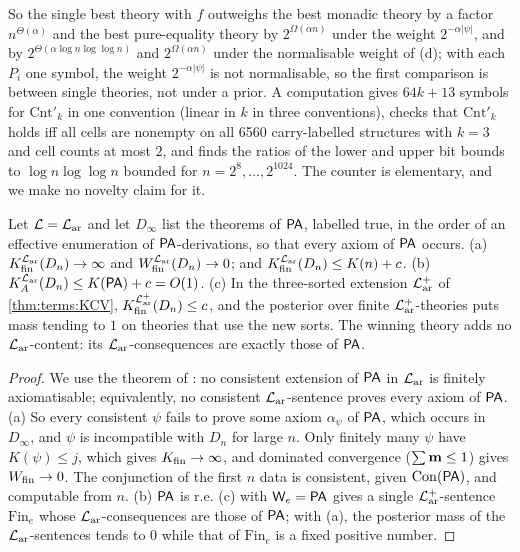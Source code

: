 So the single best theory with $f$ outweighs the best monadic theory by a factor $n^{\Theta(\alpha)}$ and the best pure-equality theory by $2^{\Omega(\alpha n)}$ under the weight $2^{-\alpha\lvert\psi\rvert}$, and by $2^{\Theta(\alpha\log n\log\log n)}$ and $2^{\Omega(\alpha n)}$ under the normalisable weight of (d); with each $P_i$ one symbol, the weight $2^{-\alpha\lvert\psi\rvert}$ is not normalisable, so the first comparison is between single theories, not under a prior. A computation gives $64k+13$ symbols for $\mathrm{Cnt}'_k$ in one convention (linear in $k$ in three conventions), checks that $\mathrm{Cnt}'_k$ holds iff all cells are nonempty on all 6560 carry-labelled structures with $k=3$ and cell counts at most $2$, and finds the ratios of the lower and upper bit bounds to $\log n\log\log n$ bounded for $n=2^8,\dots,2^{1024}$. The counter is elementary, and we make no novelty claim for it.

\begin{theorem}\label{thm:terms:PA}
Let $\mathcal L=\mathcal{L}_{\mathrm{ar}}$ and let $D_\infty$ list the theorems of $\mathsf{PA}$, labelled true, in the order of an effective enumeration of $\mathsf{PA}$-derivations, so that every axiom of $\mathsf{PA}$ occurs.
(a) $K_{\mathrm{fin}}^{\mathcal{L}_{\mathrm{ar}}}(D_n)\to\infty$ and $W_{\mathrm{fin}}^{\mathcal{L}_{\mathrm{ar}}}(D_n)\to0$; and $K_{\mathrm{fin}}^{\mathcal{L}_{\mathrm{ar}}}(D_n)\le K(n)+c$.
(b) $K_{A}^{\mathcal{L}_{\mathrm{ar}}}(D_n)\le K(\mathsf{PA})+c=O(1)$.
(c) In the three-sorted extension $\mathcal{L}_{\mathrm{ar}}^+$ of \cref{thm:terms:KCV}, $K_{\mathrm{fin}}^{\mathcal{L}_{\mathrm{ar}}^+}(D_n)\le c$, and the posterior over finite $\mathcal{L}_{\mathrm{ar}}^+$-theories puts mass tending to $1$ on theories that use the new sorts. The winning theory adds no $\mathcal{L}_{\mathrm{ar}}$-content: its $\mathcal{L}_{\mathrm{ar}}$-consequences are exactly those of $\mathsf{PA}$.
\end{theorem}

\begin{proof}
We use the theorem of \citet{rylnardzewski1952role}: no consistent extension of $\mathsf{PA}$ in $\mathcal{L}_{\mathrm{ar}}$ is finitely axiomatisable; equivalently, no consistent $\mathcal{L}_{\mathrm{ar}}$-sentence proves every axiom of $\mathsf{PA}$. (a) So every consistent $\psi$ fails to prove some axiom $\alpha_\psi$ of $\mathsf{PA}$, which occurs in $D_\infty$, and $\psi$ is incompatible with $D_n$ for large $n$. Only finitely many $\psi$ have $K(\psi)\le j$, which gives $K_{\mathrm{fin}}\to\infty$, and dominated convergence ($\sum\mathbf{m}\le1$) gives $W_{\mathrm{fin}}\to0$. The conjunction of the first $n$ data is consistent, given $\mathrm{Con}(\mathsf{PA})$, and computable from $n$. (b) $\mathsf{PA}$ is r.e. (c)  with $\mathsf{W}_{e}=\mathsf{PA}$ gives a single $\mathcal{L}_{\mathrm{ar}}^+$-sentence $\mathrm{Fin}_e$ whose $\mathcal{L}_{\mathrm{ar}}$-consequences are those of $\mathsf{PA}$; with (a), the posterior mass of the $\mathcal{L}_{\mathrm{ar}}$-sentences tends to $0$ while that of $\mathrm{Fin}_e$ is a fixed positive number.
\end{proof}

